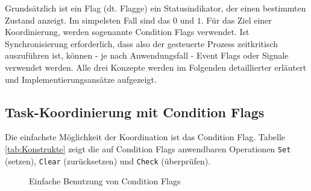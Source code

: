 \documentclass{llncs}
\begin{document}
\begin{table}
	\centering %
	\def\arraystretch{1.5} %
	\setlength{\tabcolsep}{0.5em} %
\caption{\label{tab:Konstrukte} Koordinierungs- und Synchronisationskonstrukte \autocite[vgl.][82]{Cooling2017}}
\end{table}
Grundsätzlich ist ein Flag (dt. Flagge) ein Statusindikator, der einen bestimmten Zustand anzeigt. Im simpelsten Fall sind das $0$ und $1$. Für das Ziel einer Koordinierung, werden sogenannte Condition Flags verwendet. Ist Synchronisierung erforderlich, dass also der gesteuerte Prozess zeitkritisch auszuführen ist, können - je nach Anwendungsfall - Event Flags oder Signale verwendet werden. Alle drei Konzepte werden im Folgenden detaillierter erläutert und Implementierungsansätze aufgezeigt.

\subsection{Task-Koordinierung mit Condition Flags}
\label{subsec:Koordinierung_mit_Condition_Flags}
Die einfachste Möglichkeit der Koordination ist das Condition Flag. Tabelle \ref{tab:Konstrukte} zeigt die auf Condition Flags anwendbaren Operationen \texttt{Set} (setzen), \texttt{Clear} (zurücksetzen) und \texttt{Check} (überprüfen).

\begin{figure}[h]
\centering
\def\svgwidth{300pt}

\caption{\label{fig:ConditionFlag} Einfache Benutzung von Condition Flags \autocite[vgl.][83]{Cooling2017}}
\end{figure}
\end{document}

